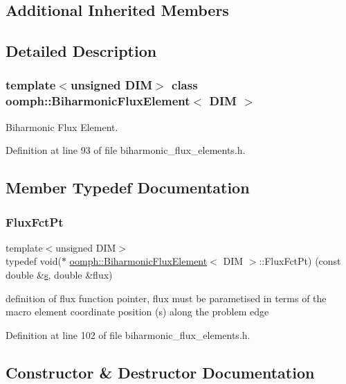 \subsection*{Additional Inherited Members}


\subsection{Detailed Description}
\subsubsection*{template$<$unsigned D\+IM$>$\newline
class oomph\+::\+Biharmonic\+Flux\+Element$<$ D\+I\+M $>$}

Biharmonic Flux Element. 

Definition at line 93 of file biharmonic\+\_\+flux\+\_\+elements.\+h.



\subsection{Member Typedef Documentation}
\mbox{\label{classoomph_1_1BiharmonicFluxElement_a0fafeac48951b37cf5cd86aa486945a8}} 
\subsubsection{\texorpdfstring{Flux\+Fct\+Pt}{FluxFctPt}}
{\footnotesize\ttfamily template$<$unsigned D\+IM$>$ \\
typedef void($\ast$ \hyperlink{classoomph_1_1BiharmonicFluxElement}{oomph\+::\+Biharmonic\+Flux\+Element}$<$ D\+IM $>$\+::Flux\+Fct\+Pt) (const double \&\hyperlink{cfortran_8h_ab7123126e4885ef647dd9c6e3807a21c}{s}, double \&flux)}

definition of flux function pointer, flux must be parametised in terms of the macro element coordinate position (s) along the problem edge 

Definition at line 102 of file biharmonic\+\_\+flux\+\_\+elements.\+h.



\subsection{Constructor \& Destructor Documentation}
\mbox{\label{classoomph_1_1BiharmonicFluxElement_adbb8aa4037b31be337cd9aaa0d9b1fee}} 
